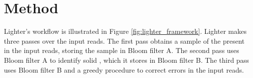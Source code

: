 \documentclass[10pt]{article}
\begin{document}


\section*{Method}
Lighter's workflow is illustrated in Figure \ref{fig:lighter_framework}. Lighter makes three passes over the input reads.  The first pass obtains a sample of the \kmers present in the input reads, storing the sample in Bloom filter A.  The second pass uses Bloom filter A to identify solid \kmers, which it stores in Bloom filter B.  The third pass uses Bloom filter B and a greedy procedure to correct errors in the input reads.
\end{document}
